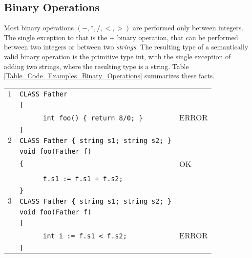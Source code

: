 \documentclass{article}
\begin{document}
\subsection{Binary Operations}
\label{subsection_Binary_Operations}
Most binary operations $(-,*,/,<,>)$ are performed only between integers.
The single exception to that is the $+$ binary operation,
that can be performed between two integers or between two \textit{strings}.
The resulting type of a semantically valid binary operation is the primitive type int,
with the single exception of adding two strings, where the resulting type is a string.
Table \ref{Table_Code_Examples_Binary_Operations} summarizes these facts.
\begin{table}[h]
\centering
\begin{tabular}{|l|l|l|}
\hline
 $1$ & \verb"CLASS Father"                     &    \\
     & \verb"{"                                &    \\
     & ~ ~ ~ ~\verb"int foo() { return 8/0; }" & ERROR \\
     & \verb"}"                                &    \\
\hline
 $2$ & \verb"CLASS Father { string s1; string s2; }" &    \\
     & \verb"void foo(Father f)"                     &    \\
     & \verb"{"                                      & OK \\
     & ~ ~ ~ ~\verb"f.s1 := f.s1 + f.s2;"            &    \\
     & \verb"}"                                      &    \\
\hline
 $3$ & \verb"CLASS Father { string s1; string s2; }" &       \\
     & \verb"void foo(Father f)"                     &       \\
     & \verb"{"                                      &       \\
     & ~ ~ ~ ~\verb"int i := f.s1 < f.s2;"           & ERROR \\
     & \verb"}"                                      &       \\

\end{tabular}
\end{table}
\end{document}
